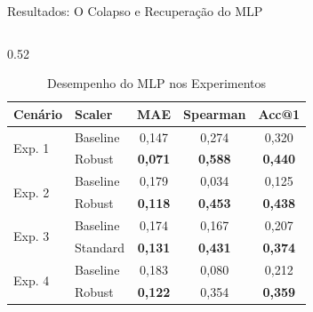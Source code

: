 \documentclass[aspectratio=169, 10pt]{beamer}
\begin{document}
\begin{frame}{Resultados: O Colapso e Recuperação do MLP}
\begin{columns}[T]
    \begin{column}{0.52\textwidth}
      \footnotesize
      \begin{table}
        \centering
        \caption{Desempenho do MLP nos Experimentos}
        \begin{tabular}{llccc}
          \toprule
          \textbf{Cenário} & \textbf{Scaler} & \textbf{MAE} & \textbf{Spearman} & \textbf{Acc@1} \\
          \midrule
          \multirow{2}{*}{Exp. 1} & Baseline & 0,147 & 0,274 & 0,320 \\
                                  & Robust   & \textbf{0,071} & \textbf{0,588} & \textbf{0,440} \\
          \midrule
          \multirow{2}{*}{Exp. 2} & Baseline & 0,179 & 0,034 & 0,125 \\
                                  & Robust   & \textbf{0,118} & \textbf{0,453} & \textbf{0,438} \\
          \midrule
          \multirow{2}{*}{Exp. 3} & Baseline & 0,174 & 0,167 & 0,207 \\
                                  & Standard & \textbf{0,131} & \textbf{0,431} & \textbf{0,374} \\
          \midrule
          \multirow{2}{*}{Exp. 4} & Baseline & 0,183 & 0,080 & 0,212 \\
                                  & Robust   & \textbf{0,122} & 0,354 & \textbf{0,359} \\
          \bottomrule
        \end{tabular}
      \end{table}
    \end{column}
  \end{columns}
\end{frame}
\end{document}
